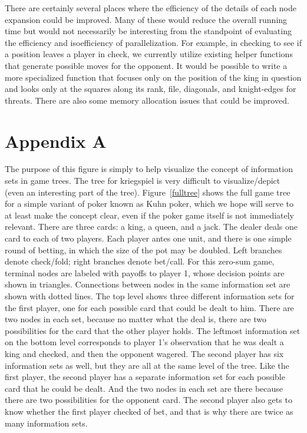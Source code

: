 \documentclass[11pt]{article}
\begin{document}
There are certainly several places where the efficiency of the details of each node expansion could be improved.  Many
of these would reduce the overall running time but would not necessarily be interesting from the standpoint of
evaluating the efficiency and isoefficiency of parallelization.  For example, in checking to see if a position leaves a
player in check, we currently utilize existing helper functions that generate possible moves for the opponent.  It would
be possible to write a more specialized function that focuses only on the position of the king in question and looks
only at the squares along its rank, file, diagonals, and knight-edges for threats.  There are also some memory
allocation issues that could be improved. 


\section{Appendix A}
The purpose of this figure is simply to help visualize the concept of information sets in game trees.  The tree for
kriegspiel is very difficult to visualize/depict (even an interesting part of the tree).  Figure~\ref{fulltree} shows
the full game tree for a simple variant of poker known as Kuhn poker, which we hope will serve to at least make the
concept clear, even if the poker game itself is not immediately relevant.  There are three cards: a king, a queen, and a
jack.  The dealer deals one card to each of two players.  Each player antes one unit, and there is one simple round of
betting, in which the size of the pot may be doubled.  Left branches denote check/fold; right branches denote bet/call.
For this zero-sum game, terminal nodes are labeled with payoffs to player 1, whose decision points are shown in
triangles.  Connections between nodes in the same information set are shown with dotted lines.  The top level shows
three different information sets for the first player, one for each possible card that could be dealt to him.  There are
two nodes in each set, because no matter what the deal is, there are two possibilities for the card that the other
player holds.  The leftmost information set on the bottom level corresponds to player 1's observation that he was dealt
a king and checked, and then the opponent wagered.  The second player has six information sets as well, but they are all
at the same level of the tree.  Like the first player, the second player has a separate information set for each
possible card that he could be dealt.  And the two nodes in each set are there because there are two possibilities for
the opponent card.  The second player also gets to know whether the first player checked of bet, and that is why there
are twice as many information sets.
\end{document}

